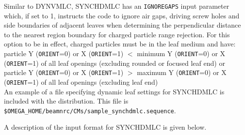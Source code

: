 \documentclass[12pt,twoside]{article}
\begin{document}
Similar to DYNVMLC, SYNCHDMLC has an {\tt IGNOREGAPS} input parameter which, if set to 1, instructs the code to ignore
air gaps, driving screw holes and side boundaries of adjacent
leaves when determining the perpendicular
distance to the nearest region boundary for
charged particle range rejection.  For this option to be in effect, charged particles must be in the leaf medium and have:\\
particle Y ({\tt ORIENT}=0) or X ({\tt ORIENT}=1) $<$ minimum Y ({\tt ORIENT}=0) or X ({\tt ORIENT}=1) of all leaf openings
(excluding rounded or focused leaf end) or\\
particle Y ({\tt ORIENT}=0) or X ({\tt ORIENT}=1) $>$ maximum Y ({\tt ORIENT}=0) or X ({\tt ORIENT}=1) of all leaf openings (excluding leaf end)\\

An example of a file specifying dynamic leaf settings for SYNCHDMLC
is included with the distribution.  This file is {\tt \$OMEGA\_HOME/beamnrc/CMs/sample\_synchdmlc.sequence}.

A description of the input format for SYNCHDMLC is given below.

\begin{small}

\end{small}


\clearpage

\vspace*{-2cm}
\renewcommand{\rightmark}{MESH CM}
\end{document}
